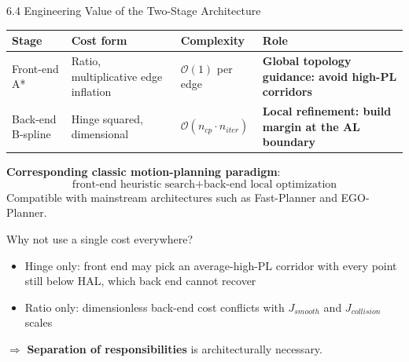 \documentclass[10pt,aspectratio=169,xcolor=dvipsnames]{beamer}
\newcommand{\1}{\mathbb{1}}
\newcommand{\innov}[1]{\textcolor{NavyBlue}{\textbf{#1}}}
\begin{document}
\begin{frame}[t]{6.4 Engineering Value of the Two-Stage Architecture}
  \scriptsize
  \vspace{-2pt}
  \begin{table}
    \scriptsize
    \setlength{\tabcolsep}{3pt}
    \renewcommand{\arraystretch}{0.95}
    \begin{tabular}{p{} p{} p{} p{}}
      \toprule
      \textbf{Stage} & \textbf{Cost form} & \textbf{Complexity} & \textbf{Role}\\
      \midrule
      Front-end A* & Ratio, multiplicative edge inflation & $\mathcal{O}(1)$ per edge & \innov{Global topology guidance: avoid high-PL corridors}\\
      Back-end B-spline & Hinge squared, dimensional & $\mathcal{O}(n_{cp}\cdot n_{iter})$ & \innov{Local refinement: build margin at the AL boundary}\\
      \bottomrule
    \end{tabular}
  \end{table}

  \vspace{1pt}
  \textbf{Corresponding classic motion-planning paradigm}:
  \[
    \text{front-end heuristic search}+\text{back-end local optimization}
  \]
  \scriptsize Compatible with mainstream architectures such as Fast-Planner and EGO-Planner.

  \vspace{1pt}
  \begin{block}{\scriptsize Why not use a single cost everywhere?}
    \tiny
    \begin{itemize}
      \item Hinge only: front end may pick an average-high-PL corridor with every point still below HAL, which back end cannot recover
      \item Ratio only: dimensionless back-end cost conflicts with $J_{smooth}$ and $J_{collision}$ scales
    \end{itemize}
    $\Rightarrow$ \textbf{Separation of responsibilities} is architecturally necessary.
  \end{block}
\end{frame}
\end{document}
